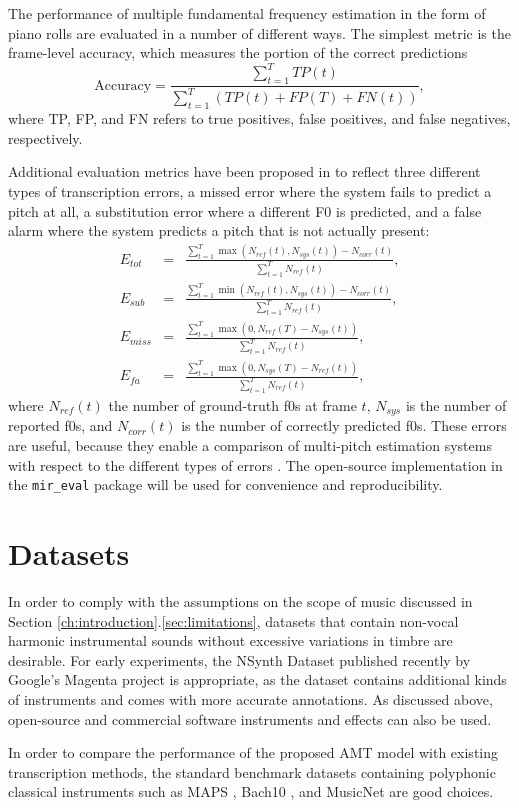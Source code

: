 The performance of multiple fundamental frequency estimation in the form of piano rolls are evaluated in a number of different ways.
The simplest metric is the frame-level accuracy, which measures the portion of the correct predictions 
\begin{equation}
\mathrm{Accuracy} = \frac{\sum_{t=1}^T TP(t)}{\sum_{t=1}^T \left ( TP(t) + FP(T) + FN(t) \right ) },
\end{equation}
where TP, FP, and FN refers to true positives, false positives, and false negatives, respectively.

Additional evaluation metrics have been proposed in \cite{poliner2007piano} to reflect three different types of transcription errors, a missed error where the system fails to predict a pitch at all, a substitution error where a different F0 is predicted, and a false alarm where the system predicts a pitch that is not actually present:
\begin{eqnarray}
E_{tot} & = & \frac{\sum_{t=1}^T \max ( N_{ref}(t), N_{sys}(t) ) - N_{corr}(t)}{\sum_{t=1}^T N_{ref}(t)}, \\
E_{sub} & = & \frac{\sum_{t=1}^T \min ( N_{ref}(t), N_{sys}(t) ) - N_{corr}(t)}{\sum_{t=1}^T N_{ref}(t)}, \\
E_{miss} & = & \frac{\sum_{t=1}^T \max ( 0, N_{ref}(T) - N_{sys}(t) )}{\sum_{t=1}^T N_{ref}(t)}, \\
E_{fa} & = &  \frac{\sum_{t=1}^T \max ( 0, N_{sys}(T) - N_{ref}(t) )}{\sum_{t=1}^T N_{ref}(t)},
\end{eqnarray}
where $N_{ref}(t)$ the number of ground-truth f0s at frame $t$, $N_{sys}$ is the number of reported f0s, and $N_{corr}(t)$ is the number of correctly predicted f0s.
These errors are useful, because they enable a comparison of multi-pitch estimation systems with respect to the different types of errors \cite{bay2009evaluation}.
The open-source implementation in the \texttt{mir\_eval} package \cite{raffel2014mir_eval} will be used for convenience and reproducibility.

\section{Datasets}

In order to comply with the assumptions on the scope of music discussed in Section \ref{ch:introduction}.\ref{sec:limitations}, datasets that contain non-vocal harmonic instrumental sounds without excessive variations in timbre are desirable.
For early experiments, the NSynth Dataset published recently by Google's Magenta project \cite{engel2017nsynth} is appropriate, as the dataset contains additional kinds of instruments and comes with more accurate annotations.
As discussed above, open-source and commercial software instruments and effects can also be used.

In order to compare the performance of the proposed AMT model with existing transcription methods, the standard benchmark datasets containing polyphonic classical instruments such as MAPS \cite{emiya2010multipitch}, Bach10 \cite{duan2010bach10}, and MusicNet \cite{thickstun2017musicnet} are good choices.
